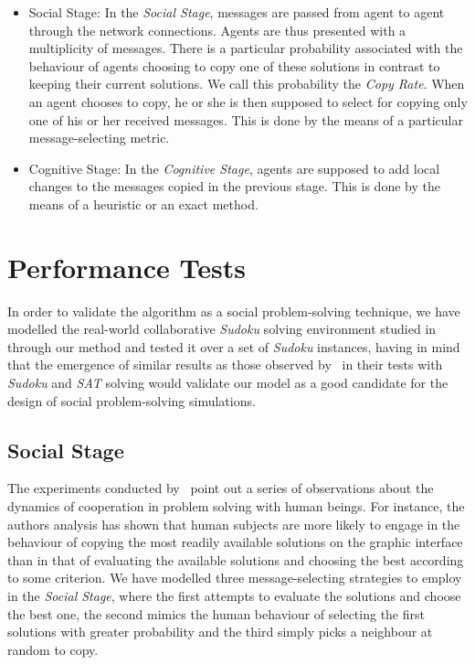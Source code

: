 \documentclass{article}
\begin{document}
\begin{itemize}
\item
Social Stage: In the {\em Social Stage}, messages are passed from agent to agent through the network connections. Agents are thus presented with a multiplicity of messages. There is a particular probability associated with the behaviour of agents choosing to copy one of these solutions in contrast to keeping their current solutions. We call this probability the {\em Copy Rate}. When an agent chooses to copy, he or she is then supposed to select for copying only one of his or her received messages. This is done by the means of a particular message-selecting metric.

\item
Cognitive Stage: In the {\em Cognitive Stage}, agents are supposed to add local changes to the messages copied in the previous stage. This is done by the means of a heuristic or an exact method.
\end{itemize}

\section{Performance Tests}

In order to validate the algorithm as a social problem-solving technique, we have modelled the real-world collaborative {\em Sudoku} solving environment studied in~\cite{farenzena:collabem} through our method and tested it over a set of {\em Sudoku} instances, having in mind that the emergence of similar results as those observed by~\cite{farenzena:collabem} in their tests with {\em Sudoku} and {\em SAT} solving would validate our model as a good candidate for the design of social problem-solving simulations.

\subsection{Social Stage}

The experiments conducted by~\cite{farenzena:collabem} point out a series of observations about the dynamics of cooperation in problem solving with human beings. For instance, the authors analysis has shown that human subjects are more likely to engage in the behaviour of copying the most readily available solutions on the graphic interface than in that of evaluating the available solutions and choosing the best according to some criterion. We have modelled three message-selecting strategies to employ in the \emph{Social Stage}, where the first attempts to evaluate the solutions and choose the best one, the second mimics the human behaviour of selecting the first solutions with greater probability and the third simply picks a neighbour at random to copy.
\end{document}
